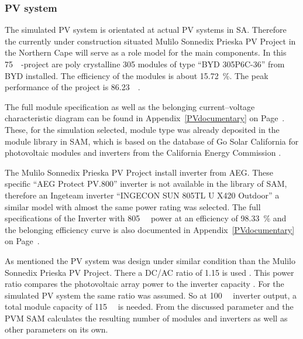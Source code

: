 \subsubsection{PV system}
The simulated PV system is orientated at actual PV systems in SA. Therefore the currently under construction situated Mulilo Sonnedix Prieska PV Project in the Northern Cape will serve as a role model for the main components. In this \SI{75}{\mega\wattsac}-project are poly crystalline \SI{305}{\wattsdc} modules of type \enquote{BYD 305P6C-36} from BYD installed. The efficiency of the modules is about 15.72~\%. The peak performance of the project is \SI{86.23}{\mega\wattsdc}. \cite{Morse2014}

The full module specification as well as the belonging current–voltage characteristic diagram can be found in Appendix~\ref{PVdocumentary} on Page~\pageref{tbl: PVmodule}. These, for the simulation selected, module type was already deposited in the module library in SAM, which is based on the database of Go Solar California for photovoltaic modules and inverters from the California Energy Commission \cite{NREL2015g}. 

The Mulilo Sonnedix Prieska PV Project install inverter from AEG. These specific \enquote{AEG Protect PV.800} inverter is not available in the library of SAM, therefore an Ingeteam inverter \enquote{INGECON SUN 805TL U X420 Outdoor} a similar model with almost the same power rating was selected. The full specifications of the Inverter with \SI{805}{\kilo\wattsac} power at an efficiency of \SI{98.33}{\percent} and the belonging efficiency curve is also documented in Appendix~\ref{PVdocumentary} on Page~\pageref{tbl: PVinverter}.

As mentioned the PV system was design under similar condition than the Mulilo Sonnedix Prieska PV Project. There a DC/AC ratio of 1.15 is used \cite{Morse2014}. This power ratio compares the photovoltaic array power to the inverter capacity \cite{Woodcock2013}. For the simulated PV system the same ratio was assumed. So at \SI{100}{\mega\wattsac} inverter output, a total module capacity of \SI{115}{\mega\wattsdc} is needed. From the discussed parameter and the PVM SAM calculates the resulting number of modules and inverters as well as other parameters on its own. 

